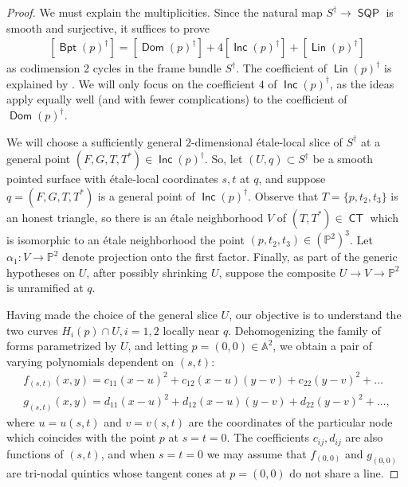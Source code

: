 \documentclass{article}
\renewcommand{\P}{\mathbb{P}}
\DeclareMathOperator{\CT}{\mathsf{CT}}
\DeclareMathOperator{\SQP}{\mathsf{SQP}}
\DeclareMathOperator{\BP}{\mathsf{Bpt}}
\DeclareMathOperator{\Dom}{\mathsf{Dom}}
\DeclareMathOperator{\Lin}{\mathsf{Lin}}
\DeclareMathOperator{\Inc}{\mathsf{Inc}}
\begin{document}
\begin{proof}
    We must explain the multiplicities. Since the natural map $S^{\dagger} \to \SQP$ is smooth and surjective, it suffices to prove 
    \begin{align}
    \label{daggermult}
    \left[\BP(p)^{\dagger} \right] = \left[\Dom(p)^{\dagger} \right] + 4\left[\Inc(p)^{\dagger}
    \right] + \left[\Lin(p)^{\dagger} \right]
    \end{align} as codimension 2 cycles in the frame bundle  $S^{\dagger}$.   The coefficient of $\Lin(p)^{\dagger}$ is explained by . We will only  focus on the coefficient $4$ of $\Inc(p)^{\dagger}$, as the ideas apply equally well (and with fewer complications) to the  coefficient of $\Dom(p)^{\dagger}$. 

    We will choose a sufficiently general $2$-dimensional \'etale-local slice of $S^\dagger$ at a general point $(F,G,T,T^{*}) \in \Inc(p)^{\dagger}$. So, let $(U,q) \subset S^{\dagger}$ be a smooth pointed surface with \'etale-local coordinates $s,t$ at $q$, and suppose $q = (F,G,T,T^{*})$ is a general point of $\Inc(p)^{\dagger}$. Observe that $T = \{p, t_{2}, t_{3}\}$ is an honest triangle, so there is an \'etale neighborhood $V$ of $(T,T^{*}) \in \CT$  which is isomorphic to an \'etale neighborhood the point $(p,t_{2},t_{3}) \in (\P^{2})^{3}$. Let $\alpha_{1}:V \to \P^{2}$ denote projection onto the first factor.  Finally, as part of the generic hypotheses on $U$, after possibly shrinking $U$, suppose the composite $U \to V \to \P^{2}$ is unramified at $q$.  
    
    Having made the choice of the general slice $U$, our objective is to understand the two curves $H_{i}(p) \cap U, i=1,2$ locally near $q$.  Dehomogenizing the family of forms parametrized by $U$, and letting $p = (0,0) \in \mathbb{A}^{2}$, we obtain a pair of varying polynomials dependent on $(s,t)$: 
    \begin{align*}
        f_{(s,t)}(x,y) = c_{11}(x-u)^{2} + c_{12}(x-u)(y-v) + c_{22}(y-v)^{2} + \dots \\
        g_{(s,t)}(x,y) = d_{11}(x-u)^{2} + d_{12}(x-u)(y-v) + d_{22}(y-v)^{2} + \dots,
    \end{align*}
    where $u = u(s,t)$ and $v = v(s,t)$ are the coordinates of the particular node which coincides with the point $p$ at $s=t=0$. The coefficients $c_{ij},d_{ij}$ are also functions of $(s,t)$, and when $s=t=0$ we may assume that $f_{(0,0)}$ and $g_{(0,0)}$ are tri-nodal quintics whose tangent cones at $p=(0,0)$ do not share a line. 


\end{proof}
\end{document}
